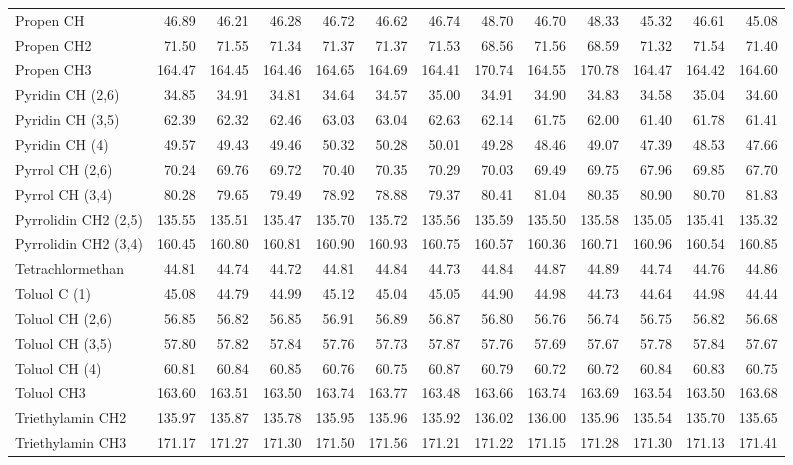 \begin{table}[ht!]
{\begin{tabular}{lrrrrrrrrrrrr}
    Propen CH & 46.89 & 46.21 & 46.28 & 46.72 & 46.62 & 46.74 & 48.70 & 46.70 & 48.33 & 45.32 & 46.61 & 45.08 \\
    Propen CH2 & 71.50 & 71.55 & 71.34 & 71.37 & 71.37 & 71.53 & 68.56 & 71.56 & 68.59 & 71.32 & 71.54 & 71.40 \\
    Propen CH3 & 164.47 & 164.45 & 164.46 & 164.65 & 164.69 & 164.41 & 170.74 & 164.55 & 170.78 & 164.47 & 164.42 & 164.60 \\
    Pyridin CH (2,6) & 34.85 & 34.91 & 34.81 & 34.64 & 34.57 & 35.00 & 34.91 & 34.90 & 34.83 & 34.58 & 35.04 & 34.60 \\
    Pyridin CH (3,5) & 62.39 & 62.32 & 62.46 & 63.03 & 63.04 & 62.63 & 62.14 & 61.75 & 62.00 & 61.40 & 61.78 & 61.41 \\
    Pyridin CH (4) & 49.57 & 49.43 & 49.46 & 50.32 & 50.28 & 50.01 & 49.28 & 48.46 & 49.07 & 47.39 & 48.53 & 47.66 \\
    Pyrrol CH (2,6) & 70.24 & 69.76 & 69.72 & 70.40 & 70.35 & 70.29 & 70.03 & 69.49 & 69.75 & 67.96 & 69.85 & 67.70 \\
    Pyrrol CH (3,4) & 80.28 & 79.65 & 79.49 & 78.92 & 78.88 & 79.37 & 80.41 & 81.04 & 80.35 & 80.90 & 80.70 & 81.83 \\
    Pyrrolidin CH2 (2,5) & 135.55 & 135.51 & 135.47 & 135.70 & 135.72 & 135.56 & 135.59 & 135.50 & 135.58 & 135.05 & 135.41 & 135.32 \\
    Pyrrolidin CH2 (3,4) & 160.45 & 160.80 & 160.81 & 160.90 & 160.93 & 160.75 & 160.57 & 160.36 & 160.71 & 160.96 & 160.54 & 160.85 \\
    Tetrachlormethan & 44.81 & 44.74 & 44.72 & 44.81 & 44.84 & 44.73 & 44.84 & 44.87 & 44.89 & 44.74 & 44.76 & 44.86 \\
    Toluol C (1) & 45.08 & 44.79 & 44.99 & 45.12 & 45.04 & 45.05 & 44.90 & 44.98 & 44.73 & 44.64 & 44.98 & 44.44 \\
    Toluol CH (2,6) & 56.85 & 56.82 & 56.85 & 56.91 & 56.89 & 56.87 & 56.80 & 56.76 & 56.74 & 56.75 & 56.82 & 56.68 \\
    Toluol CH (3,5) & 57.80 & 57.82 & 57.84 & 57.76 & 57.73 & 57.87 & 57.76 & 57.69 & 57.67 & 57.78 & 57.84 & 57.67 \\
    Toluol CH (4) & 60.81 & 60.84 & 60.85 & 60.76 & 60.75 & 60.87 & 60.79 & 60.72 & 60.72 & 60.84 & 60.83 & 60.75 \\
    Toluol CH3 & 163.60 & 163.51 & 163.50 & 163.74 & 163.77 & 163.48 & 163.66 & 163.74 & 163.69 & 163.54 & 163.50 & 163.68 \\
    Triethylamin CH2 & 135.97 & 135.87 & 135.78 & 135.95 & 135.96 & 135.92 & 136.02 & 136.00 & 135.96 & 135.54 & 135.70 & 135.65 \\
    Triethylamin CH3 & 171.17 & 171.27 & 171.30 & 171.50 & 171.56 & 171.21 & 171.22 & 171.15 & 171.28 & 171.30 & 171.13 & 171.41 \\
    \end{tabular}}%
  \label{tab:sigmacosmors}%
\end{table}%



